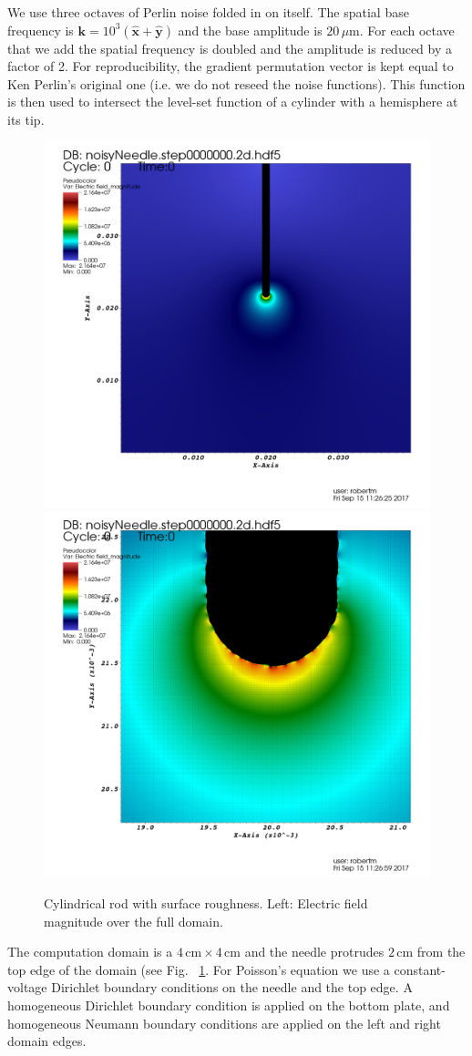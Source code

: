 \documentclass[3p]{elsarticle}
\begin{document}
We use three octaves of Perlin noise folded in on itself. The spatial base frequency is $\bm{k} = 10^3\left(\hat{\bm{x}} + \hat{\bm{y}}\right)$ and the base amplitude is $20\,\mu\text{m}$. For each octave that we add the spatial frequency is doubled and the amplitude is reduced by a factor of 2. For reproducibility, the gradient permutation vector is kept equal to Ken Perlin's original one (i.e. we do not reseed the noise functions). This function is then used to intersect the level-set function of a cylinder with a hemisphere at its tip.

\begin{figure}[ht]
  \includegraphics[width=.45\textwidth]{./figures/noisyCylinder/needle_big_t0}
  \hfill
  \includegraphics[width=.45\textwidth]{./figures/noisyCylinder/needle_small_t0}
  \caption{Cylindrical rod with surface roughness. Left: Electric field magnitude over the full domain. }
  \label{fig:roughCylinder}
\end{figure}

The computation domain is a $4\,\text{cm} \times 4\,\text{cm}$ and the needle protrudes $2\,\text{cm}$ from the top edge of the domain (see Fig. ~\ref{fig:roughCylinder}. For Poisson's equation we use a constant-voltage Dirichlet boundary conditions on the needle and the top edge. A homogeneous Dirichlet boundary condition is applied on the bottom plate, and homogeneous Neumann boundary conditions are applied on the left and right domain edges.
\end{document}
